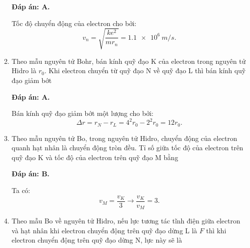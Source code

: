 \begin{enumerate}[label=\bfseries Câu \arabic*:]
	\loigiai
	{		\textbf{Đáp án: A.}
		
Tốc độ chuyển động của electron cho bởi:
$$
	v_{n} = \sqrt{\dfrac{k e^{2}}{m r_{n}}} = \SI{1,1 e6}{m/s}.
$$
		
	}
	
	\item {} 
	
	\cauhoi
	{Theo mẫu nguyên tử Bohr, bán kính quỹ đạo K của electron trong nguyên tử Hidro là $r_0$. Khi electron chuyển từ quỹ đạo N về quỹ đạo L thì bán kính quỹ đạo giảm bớt
	}
	
	\loigiai
	{		\textbf{Đáp án: A.}
		
Bán kính quỹ đạo giảm bớt một lượng cho bởi:
$$
	\Delta r = r_{N} - r_{L} = 4^{2} r_{0} - 2^{2} r_{0} = 12 r_{0}.
$$
		
	}
	
	\item {} 
	
	\cauhoi
	{Theo mẫu nguyên tử Bo, trong nguyên tử Hidro, chuyển động của electron quanh hạt nhân là chuyển động tròn đều. Tỉ số giữa tốc độ của electron trên quỹ đạo K và tốc độ của electron trên quỹ đạo M bằng
	}
	
	\loigiai
	{		\textbf{Đáp án: B.}
		
Ta có:
$$
	v_{M} = \dfrac{v_{K}}{3} \rightarrow \dfrac{v_{K}}{v_{M}} = \num{3}.
$$
		
	}
	
\item {} 
	
	\cauhoi
	{Theo mẫu Bo về nguyên tử Hidro, nếu lực tương tác tĩnh điện giữa electron và hạt nhân khi electron chuyển động trên quỹ đạo dừng L là $F$ thì khi electron chuyển động trên quỹ đạo dừng N, lực này sẽ là
	}
	

\end{enumerate}
